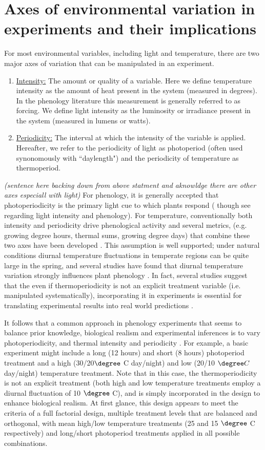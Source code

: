 \documentclass[11pt]{article}
\begin{document}
\section{Axes of environmental variation in experiments and their implications}
For most environmental variables, including light and temperature, there are two major axes of variation that can be manipulated in an experiment.  
\begin{enumerate}
\item \underline{Intensity:} The amount or quality of a variable. Here we define temperature intensity as the amount of heat present in the system (measured in degrees).  In the phenology literature this measurement is generally referred to as forcing. We define light intensity as the luminosity or irradiance present in the system (measured in lumens or watts). 
\item \underline{Periodicity:} The interval at which the intensity of the variable is applied. Hereafter, we refer to the periodicity of light as photoperiod (often used synonomously with ``daylength") and the periodicity of temperature as thermoperiod. 
\end{enumerate}
\textit{(sentence here backing down from above statment and aknowldge there are other axes especiall with light)}
For phenology, it is generally accepted that photoperiodicity is the primary light cue to which plants respond (\citep{} though see \citep{} regarding light intensity and phenology). For temperature, conventionally both intensity and periodicity drive phenological activity \citep{} and several metrics, (e.g. growing degree hours, thermal sums, growing degree days)  that combine these two axes have been developed \citep{}. This assumption is well supported; under natural conditions diurnal temperature fluctuations in temperate regions can be quite large in the spring, and several studies have found that diurnal temperature variation strongly influences plant phenology \citep{}. In fact, several studies suggest that the even if thermoperiodicity is not an explicit treatment variable (i.e. manipulated systematically), incorporating it in experiments is essential for translating experimental results into real world predictions \citep{}.

It follows that a common approach in phenology experiments that seems to balance prior knowledge, biological realism and experimental inferences is to vary photoperiodicity, and thermal intensity and periodicity \citep{}. For example, a basic experiment might include a long (12 hours) and short (8 hours) photoperiod treatment and a high (30/20$\degree$ C day/night) and low (20/10 $\degree C$ day/night) temperature treatment. Note that in this case, the thermoperiodicity is not an explicit treatment (both high and low temperature treatments employ a diurnal fluctuation of 10 $\degree$ C), and is simply incorporated in the design to enhance biological realism. At first glance, this design appears to meet the criteria of a full factorial design, multiple treatment levels that are balanced and orthogonal, with mean high/low temperature treatments (25 and 15 $\degree$ C respectively) and long/short photoperiod treatments applied in all possible combinations.
\end{document}
